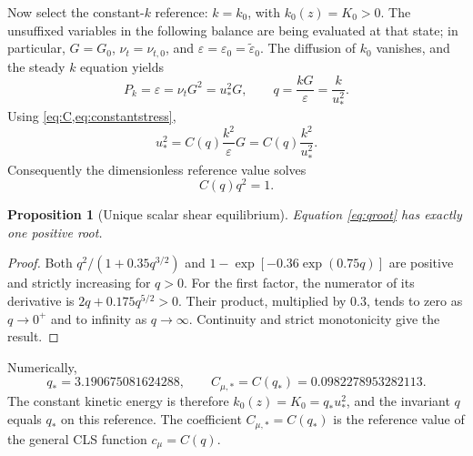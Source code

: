 \documentclass[11pt,a4paper]{article}
\numberwithin{equation}{section}
\newtheorem{proposition}{Proposition}[section]
\newcommand{\eps}{\varepsilon}
\newcommand{\et}{\widetilde{\varepsilon}}
\newcommand{\nut}{\nu_t}
\newcommand{\ust}{u_*}
\newcommand{\qs}{q_*}
\newcommand{\Cs}{C_{\mu,*}}
\begin{document}
Now select the constant-$k$ reference: $k=k_0$, with
$k_0(z)=K_0>0$. The unsuffixed variables in the following balance
are being evaluated at that state; in particular, $G=G_0$,
$\nut=\nu_{t,0}$, and $\eps=\eps_0=\et_0$. The diffusion of $k_0$
vanishes, and the steady $k$ equation yields
\begin{equation}
 P_k=\eps=\nut G^2=\ust^2G,\qquad
 q=\frac{kG}{\eps}=\frac{k}{\ust^2}.
 \label{eq:localeq}
\end{equation}
Using \cref{eq:C,eq:constantstress},
\begin{equation}
 \ust^2=C(q)\frac{k^2}{\eps}G
        =C(q)\frac{k^2}{\ust^2}.
\end{equation}
Consequently the dimensionless reference value solves
\begin{equation}
 \boxed{C(q)q^2=1.}
 \label{eq:qroot}
\end{equation}
\begin{proposition}[Unique scalar shear equilibrium]
Equation \eqref{eq:qroot} has exactly one positive root.
\end{proposition}
\begin{proof}
Both $q^2/(1+0.35q^{3/2})$ and
$1-\exp[-0.36\exp(0.75q)]$ are positive and strictly increasing for $q>0$.
For the first factor, the numerator of its derivative is
$2q+0.175q^{5/2}>0$. Their product, multiplied by $0.3$, tends to zero
as $q\to0^+$ and to infinity as $q\to\infty$. Continuity and strict
monotonicity give the result.
\end{proof}
Numerically,
\begin{equation}
 \boxed{\qs=3.190675081624288,\qquad
 \Cs=C(\qs)=0.0982278953282113.}
 \label{eq:qnumber}
\end{equation}
The constant kinetic energy is therefore
$k_0(z)=K_0=\qs\ust^2$, and the invariant $q$ equals $\qs$ on this
reference. The coefficient $\Cs=C(\qs)$ is the reference value of
the general CLS function $c_\mu=C(q)$.
\end{document}
